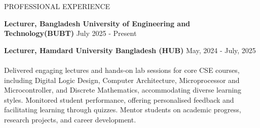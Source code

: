 \documentclass{resume} %
\begin{document}



\begin{rSection}{PROFESSIONAL EXPERIENCE}

\vspace{-1.25em}
\item {\bf Lecturer, Bangladesh University of Engineering and Technology(BUBT)} \hfill {July 2025 - Present}
\item {\bf Lecturer, Hamdard University Bangladesh (HUB)} \hfill {May, 2024 - July, 2025} \\ \\
{Delivered engaging lectures and hands-on lab sessions for core CSE courses, including Digital Logic Design, Computer Architecture, Microprocessor and Microcontroller, and Discrete Mathematics, accommodating diverse learning styles. Monitored student performance, offering personalised feedback and facilitating learning through quizzes. Mentor students on academic progress, research projects, and career development.}
\end{rSection}
\end{document}
